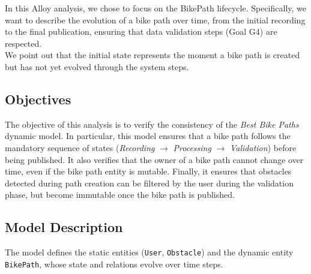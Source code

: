 In this Alloy analysis, we chose to focus on the BikePath lifecycle. Specifically, we want to describe the evolution of a bike path over time, from the initial recording to the final publication, ensuring that data validation steps (Goal G4) are respected. \\
We point out that the initial state represents the moment a bike path is created but has not yet evolved through the system steps.

\subsection{Objectives}
The objective of this analysis is to verify the consistency of the \textit{Best Bike Paths} dynamic model. In particular, this model ensures that a bike path follows the mandatory sequence of states (\textit{Recording} $\rightarrow$ \textit{Processing} $\rightarrow$ \textit{Validation}) before being published. It also verifies that the owner of a bike path cannot change over time, even if the bike path entity is mutable. Finally, it ensures that obstacles detected during path creation can be filtered by the user during the validation phase, but become immutable once the bike path is published.


\subsection{Model Description}

The model defines the static entities (\texttt{User}, \texttt{Obstacle}) and the dynamic entity \texttt{BikePath}, whose state and relations evolve over time steps.

